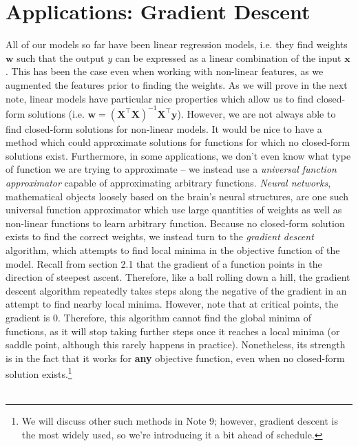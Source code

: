 \documentclass{article}
\begin{document}
\section*{Applications: Gradient Descent}
All of our models so far have been linear regression models, i.e. they find weights $\mathbf{w}$ such that the output $y$ can be expressed as a linear combination of the input $\mathbf{x}$. This has been the case even when working with non-linear features, as we augmented the features prior to finding the weights. As we will prove in the next note, linear models have particular nice properties which allow us to find closed-form solutions (i.e. $\mathbf{w} = (\mathbf{X^{\top}X})^{-1}\mathbf{X^{\top}y}$). However, we are not always able to find closed-form solutions for non-linear models. It would be nice to have a method which could approximate solutions for functions for which no closed-form solutions exist. Furthermore, in some applications, we don't even know what type of function we are trying to approximate -- we instead use a \textit{universal function approximator} capable of approximating arbitrary functions. \textit{Neural networks}, mathematical objects loosely based on the brain's neural structures, are one such universal function approximator which use large quantities of weights as well as non-linear functions to learn arbitrary function. Because no closed-form solution exists to find the correct weights, we instead turn to the \textit{gradient descent} algorithm, which attempts to find local minima in the objective function of the model. Recall from section 2.1 that the gradient of a function points in the direction of steepest ascent. Therefore, like a ball rolling down a hill, the gradient descent algorithm repeatedly takes steps along the negative of the gradient in an attempt to find nearby local minima. However, note that at critical points, the gradient is 0. Therefore, this algorithm cannot find the global minima of functions, as it will stop taking further steps once it reaches a local minima (or saddle point, although this rarely happens in practice). Nonetheless, its strength is in the fact that it works for \textbf{any} objective function, even when no closed-form solution exists.\footnote{We will discuss other such methods in Note 9; however, gradient descent is the most widely used, so we're introducing it a bit ahead of schedule.}\\\\
\end{document}
